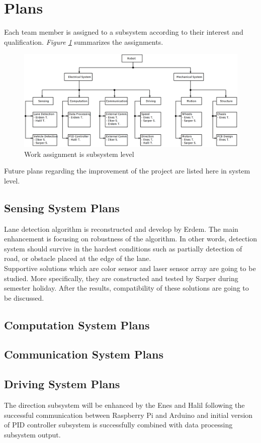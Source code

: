 \documentclass[a4paper,12pt]{article}
\begin{document}
	\section{Plans}
	Each team member is assigned to a subsystem according to their interest and qualification. \textit{Figure \ref{fig:plan-org}} summarizes the assignments.
	\begin{figure}[h]
		\includegraphics[width=\textwidth,center]{images/plan-organization}
		\caption{Work assignment is subsystem level}\label{fig:plan-org}
	\end{figure}
	Future plans regarding the improvement of the project are listed here in system level.
	\subsection{Sensing System Plans}
	Lane detection algorithm is reconstructed and develop by Erdem. The main enhancement is focusing on robustness of the algorithm. In other words, detection system should survive in the hardest conditions such as partially detection of road, or obstacle placed at the edge of the lane.\\
	   
	Supportive solutions which are color sensor and laser sensor array are going to be studied. More specifically, they are constructed and tested by Sarper during semester holiday. After the results, compatibility of these solutions are going to be discussed.\\
	
	
	\subsection{Computation System Plans}
	\subsection{Communication System Plans}
	\subsection{Driving System Plans}
		The direction subsystem will be enhanced by the Enes and Halil following the successful communication between Raspberry Pi and Arduino and initial version of PID controller subsystem is successfully combined with data processing subsystem output. \\
		
\end{document}
